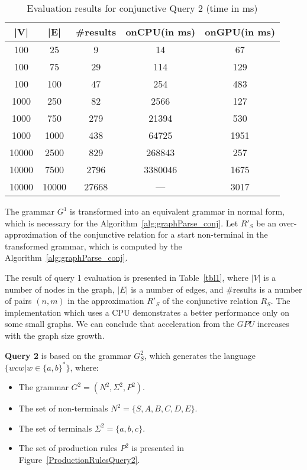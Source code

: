 \begin{table*}[h]
	\centering
	\caption{Evaluation results for conjunctive Query 2 (time in ms)}
	\label{tbl2}
	
	\begin{tabular}{ | c | c | c | c | c |}
		\hline
		|V| & |E| & \#results & onCPU(in ms) & onGPU(in ms) \\
		\hline 
		\hline
		100 & 25 & 9 & 14 & 67\\
		100 & 75 & 29 & 114 & 129\\
		100 & 100 & 47 & 254 & 483\\
		1000  & 250 & 82 & 2566 & 127\\
		1000 & 750 & 279 & 21394 & 530\\
		1000 & 1000 & 438 & 64725 & 1951\\
		10000 & 2500 & 829 & 268843 & 257\\
		10000 & 7500 & 2796 & 3380046 & 1675\\
		10000 & 10000 & 27668 & --- & 3017\\
		\hline
	\end{tabular}
	
\end{table*}


The grammar $G^1$ is transformed into an equivalent grammar in normal form, which is necessary for the Algorithm~\ref{alg:graphParse_conj}. Let $R'_S$ be an over-approximation of the conjunctive relation for a start non-terminal in the transformed grammar, which is computed by the Algorithm~\ref{alg:graphParse_conj}.

The result of query 1 evaluation is presented in Table~\ref{tbl1}, where $|V|$ is a number of nodes in the graph, $|E|$ is a number of edges, and \#results is a number of pairs $(n,m)$ in the approximation $R'_S$ of the conjunctive relation $R_S$. The implementation which uses a CPU demonstrates a better performance only on some small graphs. We can conclude that acceleration from the $GPU$ increases with the graph size growth.

\textbf{Query 2} is based on the grammar $G^2_S$, which generates the language $\{wcw | w \in \{a,b\}^*\}$, where:
\begin{itemize}
	\item The grammar $G^2 = (N^2, \Sigma^2, P^2)$.
	\item The set of non-terminals $N^2 = \{S, A, B, C, D, E\}$.
	\item The set of terminals $\Sigma^2 = \{a, b, c\}.$
	\item The set of production rules $P^2$ is presented in Figure~\ref{ProductionRulesQuery2}.
\end{itemize}

